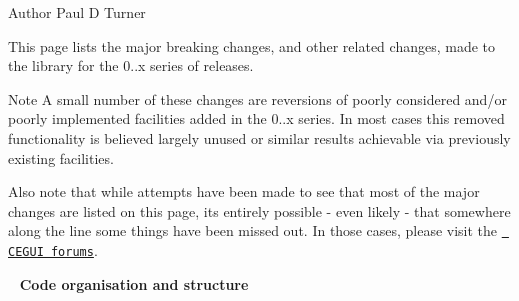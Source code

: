 \begin{DoxyAuthor}{Author}
Paul D Turner
\end{DoxyAuthor}
This page lists the major breaking changes, and other related changes, made to the library for the 0..\+x series of releases.

\begin{DoxyNote}{Note}
A small number of these changes are reversions of poorly considered and/or poorly implemented facilities added in the 0..\+x series. In most cases this removed functionality is believed largely unused or similar results achievable via previously existing facilities.

Also note that while attempts have been made to see that most of the major changes are listed on this page, it\textquotesingle{}s entirely possible -\/ even likely -\/ that somewhere along the line some things have been missed out. In those cases, please visit the \href{http://forums.cegui.org.uk/}{\texttt{ C\+E\+G\+UI forums}}.
\end{DoxyNote}
~\newline
 {\bfseries{Code organisation and structure}}
